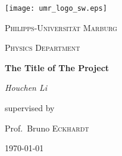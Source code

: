 \begin{titlepage}
	\centering
	\texttt{[image: umr\_logo\_sw.eps]}\par\vspace{1cm}
	{\scshape\LARGE Philipps-Universit\"at Marburg\par}
	\vspace{1cm}
	{\scshape\Large Physics Department\par}
	\vspace{1.5cm}
	{\huge\bfseries The Title of The Project\par}
	\vspace{2cm}
	{\Large\itshape Houchen Li\par}
	\vfill
	supervised by\par
	Prof.~Bruno \textsc{Eckhardt}
		
	\vfill

	{\large \today\par}


\end{titlepage}
